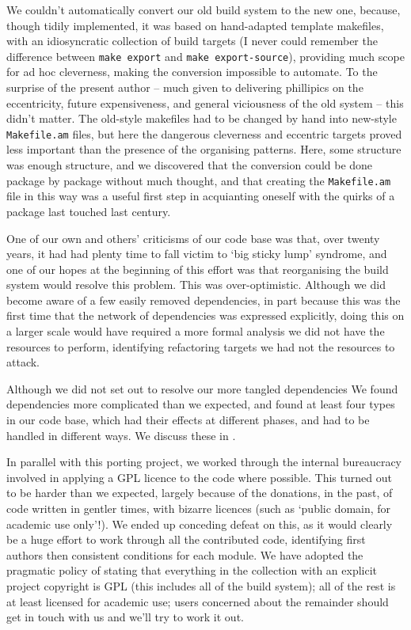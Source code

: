 \documentclass{speauth}
\begin{document}
We couldn't automatically convert our old build system to the new one,
because, though tidily implemented, it was based on hand-adapted
template makefiles, with an idiosyncratic collection of build targets
(I never could remember the difference between \texttt{make export}
and \texttt{make export-source}), providing much scope for ad hoc
cleverness, making the conversion impossible to automate.  To the
surprise of the present author -- much given to 
delivering phillipics on the eccentricity, future expensiveness, and
general viciousness of the old system -- this didn't matter.  The
old-style makefiles had to be changed by hand into new-style
\texttt{Makefile.am} files, but here the dangerous cleverness and
eccentric targets proved less important than the presence of the
organising patterns.  Here, some structure was enough structure, and
we discovered that the conversion could be done
package by package without much thought, and that creating the
\texttt{Makefile.am} file in this way was a useful first step in
acquianting oneself with the quirks of a package last touched last century.

One of our own and others' criticisms of our code base was that, over
twenty years, it had had plenty time to fall victim to `big sticky
lump' syndrome, and one of our hopes at the beginning of this effort
was that reorganising the build system would resolve this problem.
This was over-optimistic.  Although we did become aware of a few
easily removed dependencies, in part because this was the first time
that the network of dependencies was expressed explicitly, doing this
on a larger scale would have required a more formal analysis we did
not have the resources to perform, identifying refactoring targets we
had not the resources to attack.

Although we did not set out to resolve our more tangled dependencies
We found dependencies more complicated than we expected, and found at
least four types in our code base, which had their effects at
different phases, and had to be handled in different ways.  We discuss
these in .

In parallel with this porting project, we worked through the internal
bureaucracy involved in applying a GPL licence to the code where
possible.  This turned out to be harder than we expected, largely
because of the donations, in the past, of code written in gentler
times, with bizarre licences (such as `public domain, for academic use
only'!).  We ended up conceding defeat on this, as it would clearly be
a huge effort to work through all the contributed code, identifying
first authors then consistent conditions for each module.  We have
adopted the pragmatic policy of stating that everything in the
collection with an explicit project copyright is GPL (this includes
all of the build system); all of the rest is at least licensed for
academic use; users concerned about the remainder should get in touch
with us and we'll try to work it out.
\end{document}
